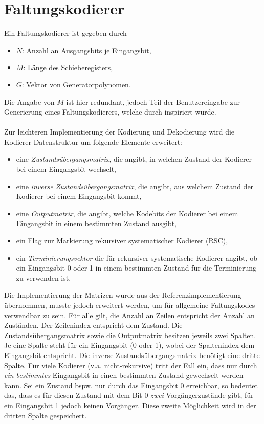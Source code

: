 \section{Faltungskodierer}
\label{kapitel:implementierung_faltungskodierer}
Ein Faltungskodierer ist gegeben durch 
\begin{itemize}
\item $N$: Anzahl an Ausgangsbits je Eingangsbit,
\item $M$: Länge des Schieberegisters,
\item $G$: Vektor von Generatorpolynomen.
\end{itemize}
Die Angabe von $M$ ist hier redundant, jedoch Teil der Benutzereingabe zur Generierung eines Faltungskodierers, welche durch \cite{morelos2006art} inspiriert wurde.
\\
\\
Zur leichteren Implementierung der Kodierung und Dekodierung wird die Kodierer-Datenstruktur um folgende Elemente erweitert:
\begin{itemize}
\item eine \emph{Zustandsübergangsmatrix}, die angibt, in welchen Zustand der Kodierer bei einem Eingangsbit wechselt,
\item eine \emph{inverse Zustandsübergangsmatrix}, die angibt, aus welchem Zustand der Kodierer bei einem Eingangsbit kommt,
\item eine \emph{Outputmatrix}, die angibt, welche Kodebits der Kodierer bei einem Eingangsbit in einem bestimmten Zustand ausgibt,
\item ein Flag zur Markierung rekursiver systematischer Kodierer (RSC),
\item ein \emph{Terminierungsvektor} die für rekursiver systematische Kodierer angibt, ob ein Eingangsbit 0 oder 1 in einem bestimmten Zustand für die Terminierung zu verwenden ist.
\end{itemize}
Die Implementierung der Matrizen wurde aus der Referenzimplementierung übernommen, musste jedoch erweitert werden, um für allgemeine Faltungskodes verwendbar zu sein. Für alle gilt, die Anzahl an Zeilen entspricht der Anzahl an Zuständen. Der Zeilenindex entspricht dem Zustand. Die Zustandsübergangsmatrix sowie die Outputmatrix besitzen jeweils zwei Spalten. Je eine Spalte steht für ein Eingangsbit (0 oder 1), wobei der Spaltenindex dem Eingangsbit entspricht. Die inverse Zustandsübergangsmatrix benötigt eine dritte Spalte. Für viele Kodierer (v.a. nicht-rekursive) tritt der Fall ein, dass nur durch \emph{ein bestimmtes} Eingangsbit in einen bestimmten Zustand gewechselt werden kann. Sei ein Zustand bspw. nur durch das Eingangsbit 0 erreichbar, so bedeutet das, dass es für diesen Zustand mit dem Bit 0 \emph{zwei} Vorgängerzustände gibt, für ein Eingangsbit 1 jedoch keinen Vorgänger. Diese zweite Möglichkeit wird in der dritten Spalte gespeichert.
